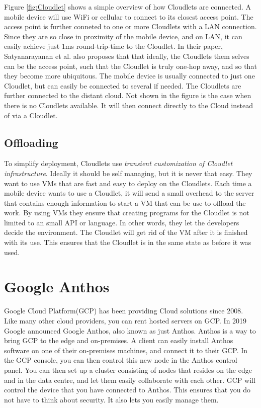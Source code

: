 Figure \ref{fig:Cloudlet} shows a simple overview of how Cloudlets are connected. A mobile device will use WiFi or cellular to connect to its closest access point. The access point is further conneted to one or more Cloudlets with a LAN connection. Since they are so close in proximity of the mobile device, and on LAN, it can easily achieve just 1ms round-trip-time to the Cloudlet. In their paper, Satyanarayanan et al.\cite{satyanarayanan_case_2009} also proposes that that ideally, the Cloudlets them selves can be the access point, such that the Cloudlet is truly one-hop away, and so that they become more ubiquitous. The mobile device is usually connected to just one Cloudlet, but can easily be connected to several if needed. The Cloudlets are further connected to the distant cloud. Not shown in the figure is the case when there is no Cloudlets available. It will then connect directly to the Cloud instead of via a Cloudlet. 


\subsection{Offloading}
To simplify deployment, Cloudlets use \textit{transient customization of Cloudlet infrastructure}. Ideally it should be self managing, but it is never that easy. They want to use VMs that are fast and easy to deploy on the Cloudlets. Each time a mobile device wants to use a Cloudlet, it will send a small overhead to the server that contains enough information to start a VM that can be use to offload the work. By using VMs they ensure that creating programs for the Cloudlet is not limited to an small API or language. In other words, they let the developers decide the environment. The Cloudlet will get rid of the VM after it is finished with its use. This ensures that the Cloudlet is in the same state as before it was used.






\section{Google Anthos}
Google Cloud Platform(GCP) has been providing Cloud solutions since 2008. Like many other cloud providers, you can rent hosted servers on GCP. In 2019 Google announced Google Anthos, also known as just Anthos. Anthos is a way to bring GCP to the edge and on-premises\cite{noauthor_anthos_nodate}. A client can easily install Anthos software on one of their on-premises machines, and connect it to their GCP. In the GCP console, you can then control this new node in the Anthos control panel. You can then set up a cluster consisting of nodes that resides on the edge and in the data centre, and let them easily collaborate with each other. GCP will control the device that you have connected to Anthos. This ensures that you do not have to think about security. It also lets you easily manage them.

